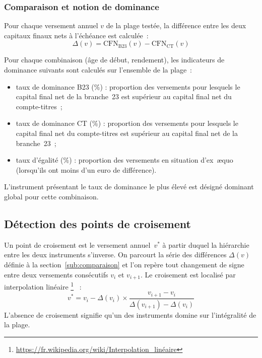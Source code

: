 ﻿\documentclass[12pt, a4paper]{article}
\begin{document}
\subsubsection*{Comparaison et notion de dominance}
\label{sub:comparaison}

Pour chaque versement annuel $v$ de la plage testée, la différence entre les
deux capitaux finaux nets à l'échéance est calculée~:
\begin{equation}
  \Delta(v) = \text{CFN}_{\text{B23}}(v) - \text{CFN}_{\text{CT}}(v)
\end{equation}


Pour chaque combinaison (âge de début, rendement), les indicateurs de dominance
suivants sont calculés sur l'ensemble de la plage~:
\begin{itemize}
  \item taux de dominance B23 (\%) : proportion des versements pour lesquels
    le capital final net de la branche~23 est supérieur au capital final net du compte-titres~;
  \item taux de dominance CT (\%) : proportion des versements pour lesquels
    le capital final net du compte-titres est supérieur au capital final net de la branche~23~;
  \item taux d'égalité (\%) : proportion des versements en situation d'ex~æquo (lorsqu'ils ont moins d'un euro de différence).
\end{itemize}
L'instrument présentant le taux de dominance le plus élevé est désigné dominant
global pour cette combinaison. 

\subsection{Détection des points de croisement}

Un point de croisement est le versement annuel~$v^*$ à partir duquel la
hiérarchie entre les deux instruments s'inverse. On parcourt la série des
différences $\Delta(v)$ définie à la section~\ref{sub:comparaison} et l'on
repère tout changement de signe entre deux versements consécutifs $v_i$ et
$v_{i+1}$. Le croisement est localisé par interpolation linéaire \footnote{\url{https://fr.wikipedia.org/wiki/Interpolation_linéaire}} ~:
\begin{equation}
  v^* = v_i - \Delta(v_i) \times \frac{v_{i+1} - v_i}{\Delta(v_{i+1}) - \Delta(v_i)}
\end{equation}
L'absence de croisement signifie qu'un des
instruments domine sur l'intégralité de la plage. 
\end{document}
